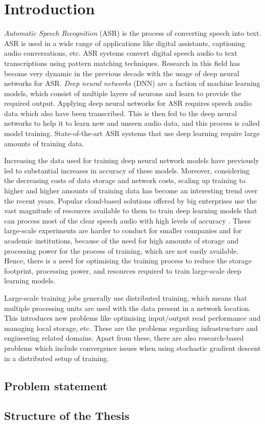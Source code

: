 \chapter{Introduction}
\label{chapter:intro}
\emph{Automatic Speech Recognition} (ASR) is the process of converting speech into text. ASR is used in a wide range of applications like digital assistants,  captioning audio conversations, etc. ASR systems convert digital speech audio to text transcriptions using pattern matching techniques. Research in this field has become very dynamic in the previous decade with the usage of deep neural networks for ASR. \emph{Deep neural networks} (DNN) are a faction of machine learning models, which consist of multiple layers of neurons and learn to provide the required output. Applying deep neural networks for ASR requires speech audio data which also have been transcribed. This is then fed to the deep neural networks to help it to learn new and unseen audio data, and this process is called model training. State-of-the-art ASR systems that use deep learning require large amounts of training data. 

Increasing the data used for training deep neural network models have previously led to substantial increases in accuracy of these models. Moreover, considering the decreasing costs of data storage and network costs, scaling up training to higher and higher amounts of training data has become an interesting trend over the recent years. Popular cloud-based solutions offered by big enterprises use the vast magnitude of resources available to them to train deep learning models that can process most of the clear speech audio with high levels of accuracy \cite{Li2020OnRecognition}. These large-scale experiments are harder to conduct for smaller companies and for academic institutions, because of the need for high amounts of storage and processing power for the process of training, which are not easily available. Hence, there is a need for optimising the training process to reduce the storage footprint, processing power, and resources required to train large-scale deep learning models.

Large-scale training jobs generally use distributed training, which means that multiple processing units are used with the data present in a network location. This introduces new problems like optimising input/output read performance and managing local storage, etc. These are the problems regarding infrastructure and engineering related domains. Apart from these, there are also research-based problems which include convergence issues when using stochastic gradient descent in a distributed setup of training.  



\section{Problem statement}




\section{Structure of the Thesis}
\label{section:structure} 


